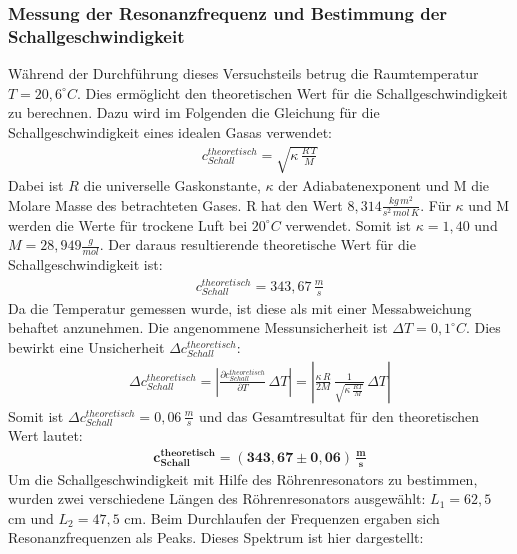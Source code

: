 \documentclass[german,  %
parskip=full,  %
]{scrartcl}
\begin{document}
\subsubsection{Messung der Resonanzfrequenz und Bestimmung der Schallgeschwindigkeit}
Während der Durchführung dieses Versuchsteils betrug die Raumtemperatur $T=20,6^{\circ} C$. Dies ermöglicht den theoretischen Wert für die Schallgeschwindigkeit zu berechnen. Dazu wird im Folgenden die Gleichung für die Schallgeschwindigkeit eines idealen Gasas verwendet:
\begin{align}
c_{Schall}^{theoretisch} = \sqrt{\kappa \, \frac{R\, T}{M}}
\end{align}
Dabei ist $R$ die universelle Gaskonstante, $\kappa$ der Adiabatenexponent und M die Molare Masse des betrachteten Gases. R hat den Wert $8,314 \frac{kg \, m^2}{s^2 \, mol \, K}$.
Für $\kappa$ und M werden die Werte für trockene Luft bei $20^{\circ}C$ verwendet. Somit ist $\kappa=1,40$ und $M=28,949 \frac{g}{mol}$. Der daraus resultierende theoretische Wert für die Schallgeschwindigkeit ist:
\begin{align}
c_{Schall}^{theoretisch}=343,67 \, \frac{m}{s}
\end{align}
Da die Temperatur gemessen wurde, ist diese als mit einer Messabweichung behaftet anzunehmen. Die angenommene Messunsicherheit ist $\Delta T=0,1^{\circ}C$. Dies bewirkt eine Unsicherheit $\Delta c_{Schall}^{theoretisch}$:
\begin{align}
\Delta c_{Schall}^{theoretisch} = \left| \frac{\partial c_{Schall}^{theoretisch}}{\partial T} \, \Delta T \right| =\left| \frac{\kappa \, R}{2M}\, \frac{1}{\sqrt{\kappa \, \frac{RT}{M}}} \, \Delta T \right| 
\end{align}
Somit ist $\Delta c_{Schall}^{theoretisch}=0,06\, \frac{m}{s}$ und das Gesamtresultat für den theoretischen Wert lautet:
\begin{align}
\boldsymbol{c_{Schall}^{theoretisch} = (343,67 \pm 0,06) \, \frac{m}{s}}
\end{align}
\newline
\newline Um die Schallgeschwindigkeit mit Hilfe des Röhrenresonators zu bestimmen, wurden zwei verschiedene Längen des Röhrenresonators ausgewählt: $L_1=62,5$ cm und $L_{2}=47,5$ cm. Beim Durchlaufen der Frequenzen ergaben sich Resonanzfrequenzen als Peaks. Dieses Spektrum ist hier dargestellt:
\end{document}
